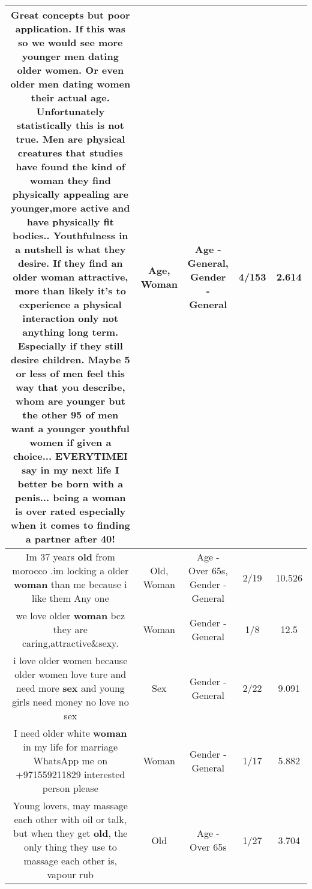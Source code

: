 \documentclass[11pt]{article}
\newlength\mylength
\begin{document}
\begin{center}
\begin{longtable}{|C{.65\mylength}|C{.30\mylength}|C{.12\mylength}|C{.12\mylength}|C{.12\mylength}|}
  \small Great concepts but poor application. If this was so we would see more younger men dating older women. Or even older men dating women their actual \textbf{age}. Unfortunately statistically this is not true. Men are physical creatures that studies have found the kind of \textbf{woman} they find physically appealing are  younger,more active and have physically fit bodies.. Youthfulness in a nutshell is what they desire. If they find an older \textbf{woman} attractive, more than likely it's to experience a physical interaction only not anything long term. Especially if they still desire children. Maybe 5 or less of men feel this way that you describe, whom are younger but the other 95 of men want a younger youthful women if given a choice... EVERYTIMEI say in my next life I better be born with a penis... being a \textbf{woman} is over rated especially when it comes to finding a partner after 40!\normalsize   & Age, Woman & Age - General, Gender - General & 4/153 & 2.614 \\  \hline
  \small Im 37 years \textbf{old} from morocco .im locking a older \textbf{woman} than me because i like them Any one\normalsize   & Old, Woman & Age - Over 65s, Gender - General & 2/19 & 10.526 \\  \hline
  \small we love older \textbf{woman} bcz they are caring,attractive\&sexy.\normalsize   & Woman & Gender - General & 1/8 & 12.5 \\  \hline
  \small i love older women because older women love ture and need more \textbf{sex}   and young girls need money no love no sex\normalsize   & Sex & Gender - General & 2/22 & 9.091 \\  \hline
  \small I need older white \textbf{woman} in my life for marriage WhatsApp me on +971559211829 interested  person please\normalsize   & Woman & Gender - General & 1/17 & 5.882 \\  \hline
  \small Young lovers, may massage each other with oil or talk, but when they get \textbf{old}, the only thing they use to massage  each other is, vapour rub\normalsize   & Old & Age - Over 65s & 1/27 & 3.704 \\  \hline

\end{longtable}
\end{center}
\end{document}
